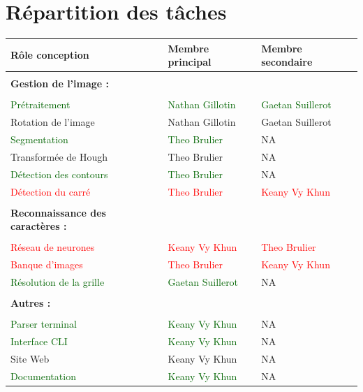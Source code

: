 \chapter{Répartition des tâches}
\begin{tabularx}{0.95\linewidth}{>{\raggedright\arraybackslash}X X >{\raggedright\arraybackslash}X}
    Rôle conception & Membre principal & Membre secondaire \\\hline
    \\\textbf{Gestion de l'image :}\\\\
     \textcolor{darkgreen}{Prétraitement} & \textcolor{darkgreen}{Nathan Gillotin} & \textcolor{darkgreen}{Gaetan Suillerot}\\
    \textcolor{darkyellow}{Rotation de l’image} & \textcolor{darkyellow}{Nathan Gillotin} & \textcolor{darkyellow}{Gaetan Suillerot}\\
    \textcolor{darkgreen}{Segmentation} & \textcolor{darkgreen}{Theo Brulier} & NA\\
    \textcolor{darkyellow}{Transformée de Hough} & \textcolor{darkyellow}{Theo Brulier} & NA\\
    \textcolor{darkgreen}{Détection des contours} & \textcolor{darkgreen}{Theo Brulier} & NA\\
    \textcolor{red}{Détection du carré} & \textcolor{red}{Theo Brulier} & \textcolor{red}{Keany Vy Khun}\\
    \\\textbf{Reconnaissance des caractères :}\\\\
    \textcolor{red}{Réseau de neurones} & \textcolor{red}{Keany Vy Khun} & \textcolor{red}{Theo Brulier}\\
    \textcolor{red}{Banque d'images} & \textcolor{red}{Theo Brulier} & \textcolor{red}{Keany Vy Khun}\\
    \textcolor{darkgreen}{Résolution de la grille} & \textcolor{darkgreen}{Gaetan Suillerot} & NA\\
    \\\textbf{Autres :}\\\\
    \textcolor{darkgreen}{Parser terminal} & \textcolor{darkgreen}{Keany Vy Khun} & NA\\
    \textcolor{darkgreen}{Interface CLI} & \textcolor{darkgreen}{Keany Vy Khun} & NA\\
    \textcolor{darkyellow}{Site Web} & \textcolor{darkyellow}{Keany Vy Khun} & NA\\
    \textcolor{darkgreen}{Documentation} & \textcolor{darkgreen}{Keany Vy Khun} & NA\\
\end{tabularx}

